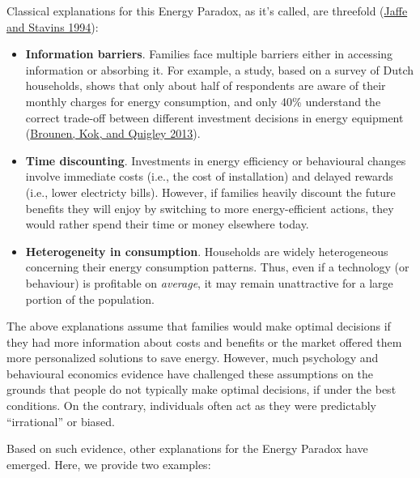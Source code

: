 \documentclass[
  11pt,
  captions=heading]{scrreport}
\begin{document}
Classical explanations for this Energy Paradox, as it's called, are
threefold (\protect\hyperlink{ref-jaffe1994energy}{Jaffe and Stavins
1994}):

\begin{itemize}
\item
  \textbf{Information barriers}. Families face multiple barriers either
  in accessing information or absorbing it. For example, a study, based
  on a survey of Dutch households, shows that only about half of
  respondents are aware of their monthly charges for energy consumption,
  and only 40\% understand the correct trade-off between different
  investment decisions in energy equipment
  (\protect\hyperlink{ref-brounen2013energy}{Brounen, Kok, and Quigley
  2013}).
\item
  \textbf{Time discounting}. Investments in energy efficiency or
  behavioural changes involve immediate costs (i.e., the cost of
  installation) and delayed rewards (i.e., lower electricty bills).
  However, if families heavily discount the future benefits they will
  enjoy by switching to more energy-efficient actions, they would rather
  spend their time or money elsewhere today.
\item
  \textbf{Heterogeneity in consumption}. Households are widely
  heterogeneous concerning their energy consumption patterns. Thus, even
  if a technology (or behaviour) is profitable on \emph{average}, it may
  remain unattractive for a large portion of the population.
\end{itemize}

The above explanations assume that families would make optimal decisions
if they had more information about costs and benefits or the market
offered them more personalized solutions to save energy. However, much
psychology and behavioural economics evidence have challenged these
assumptions on the grounds that people do not typically make optimal
decisions, if under the best conditions. On the contrary, individuals
often act as they were predictably ``irrational'' or biased.

Based on such evidence, other explanations for the Energy Paradox have
emerged. Here, we provide two examples:
\end{document}
